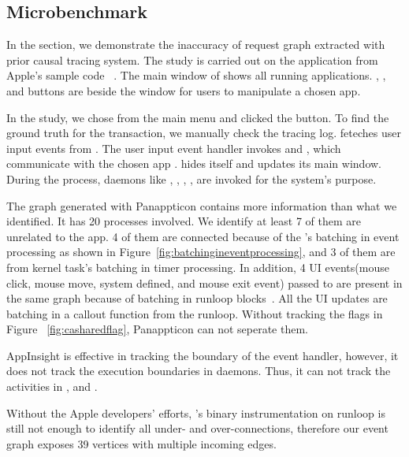 \subsection{Microbenchmark} \label{sec:toystudy}

In the section, we demonstrate the inaccuracy of request graph extracted with
prior causal tracing system. The study is carried out on the application from
Apple's sample code ~\cite{applist}. The main window of 
shows all running applications. , , and 
buttons are beside the window for users to manipulate a chosen app.


In the study, we chose  from the main menu and clicked
the  button. To find the ground truth for the transaction, we
manually check the tracing log.  feteches user input events from
. The user input event handler invokes  and
, which communicate with the chosen app .
 hides itself and  updates its main window. During
the process, daemons like , , ,
,  are invoked for the system's purpose.

The graph generated with Panappticon contains more information than
what we identified. It has 20 processes involved. We identify at least
7 of them are unrelated to the app. 4 of them are connected because
of the 's batching in event processing as shown in
Figure~\ref{fig:batchingineventprocessing}, and 3 of them are from kernel task's
batching in timer processing. In addition, 4 UI events(mouse click, mouse move,
system defined, and mouse exit event) passed to  are present in the
same graph because of batching in runloop blocks~\cite{runloop}. All the UI
updates are batching in a callout function from the runloop. Without tracking
the flags in Figure ~\ref{fig:casharedflag}, Panappticon can not seperate them.

AppInsight is effective in tracking the boundary of the event handler, however,
it does not track the execution boundaries in daemons. Thus, it can not track
the activities in ,  and .

Without the Apple developers' efforts, \xxx's binary instrumentation on runloop is
still not enough to identify all under- and over-connections, therefore our event graph
exposes 39 vertices with multiple incoming edges.

